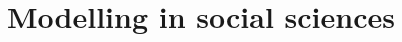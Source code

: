 \documentclass[11pt,oneside,a4paper,openright]{report}
\begin{document}


\section{Modelling in social sciences}
\label{sec:modelsinSC}


\end{document}
